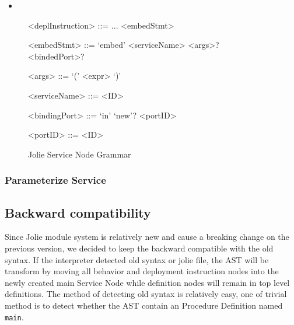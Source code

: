 \begin{itemize}
    \item 
\end{itemize}



\begin{figure}[h]
    \begin{framed}
        \begin{grammar}
            <deplInstruction> ::= ... 
            \alt <embedStmt>

            <embedStmt> ::= `embed' <serviceName> <args>? <bindedPort>?  

            <args> ::= `(' <expr> `)'

            <serviceName> ::= <ID>

            <bindingPort> ::= `in' `new'? <portID>

            <portID> ::= <ID>

        \end{grammar}
    \end{framed}
    \caption{Jolie Service Node Grammar}
    \label{fig:jolie-servicenode-grammar}
\end{figure}



\subsubsection{Parameterize Service}

\subsection{Backward compatibility}

Since Jolie module system is relatively new and cause a breaking change on the previous version, we decided to keep the backward compatible with the old syntax. If the interpreter detected old syntax or jolie file, the AST will be transform by moving all behavior and deployment instruction nodes into the newly created main Service Node while definition nodes will remain in top level definitions. The method of detecting old syntax is relatively easy, one of trivial method is to detect whether the AST contain an Procedure Definition named \texttt{main}.

